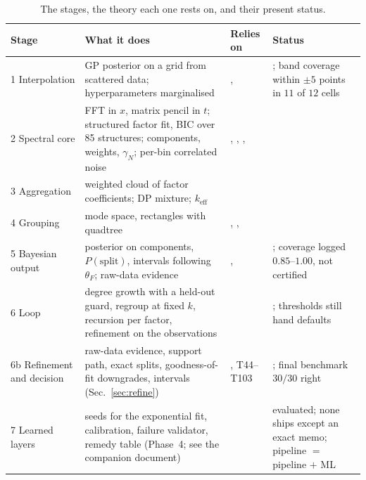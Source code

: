 \begin{table}[!htb]
\centering\small
\begin{tabular}{@{}L{2.6cm}L{5.6cm}L{3.2cm}L{2.6cm}@{}}
\toprule
Stage & What it does & Relies on & Status\\ Interpolation & GP posterior on a grid from scattered data; hyperparameters marginalised & ,  & \impl{}; band coverage within $\pm5$ points in $11$ of $12$ cells\\
2 Spectral core & FFT in $x$, matrix pencil in $t$; structured factor fit, BIC over 85 structures; components, weights, $\gamma_N$; per-bin correlated noise & , , ,  & \impl{}\\
3 Aggregation & weighted cloud of factor coefficients; DP mixture; $k_{\mathrm{eff}}$ &  & \impl{}\\
4 Grouping & mode space, rectangles with quadtree & , ,  & \impl{}\\
5 Bayesian output & posterior on components, $P(\text{split})$, intervals following $\theta_F$; raw-data evidence & ,  & \impl{}; coverage logged $0.85$--$1.00$, not certified\\
6 Loop & degree growth with a held-out guard, regroup at fixed $k$, recursion per factor, refinement on the observations &  & \impl{}; thresholds still hand defaults\\
6b Refinement and decision & raw-data evidence, support path, exact splits, goodness-of-fit downgrades, intervals (Sec.~\ref{sec:refine}) & , T44--T103 & \impl{}; final benchmark $30/30$ right\\
7 Learned layers & seeds for the exponential fit, calibration, failure validator, remedy table (Phase~4; see the companion document) &  & evaluated; none ships except an exact memo; pipeline $=$ pipeline $+$ ML\\
\bottomrule
\end{tabular}
\caption{The stages, the theory each one rests on, and their present status.}\label{tab:stages}
\end{table}

